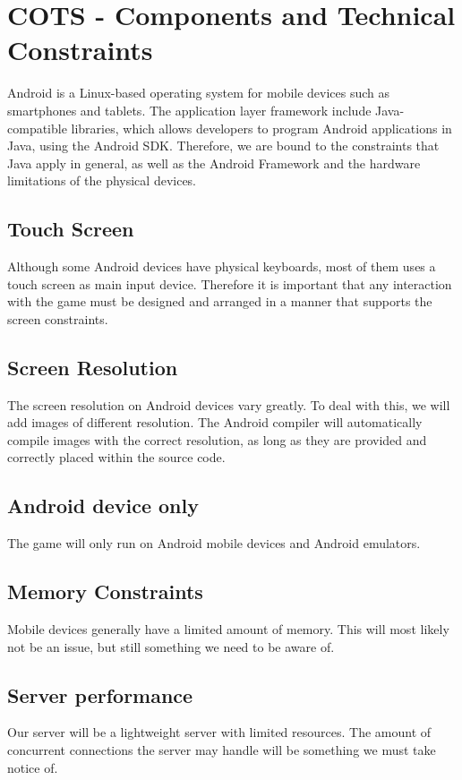 \section{COTS - Components and Technical Constraints}
Android is a Linux-based operating system for mobile devices such as smartphones and tablets. The application layer framework include Java-compatible libraries, which allows developers to program Android applications in Java, using the Android SDK. Therefore, we are bound to the constraints that Java apply in general, as well as the Android Framework and the hardware limitations of the physical devices.

\subsection{Touch Screen}
Although some Android devices have physical keyboards, most of them uses a touch screen as main input device. Therefore it is important that any interaction with the game must be designed and arranged in a manner that supports the screen constraints. 

\subsection{Screen Resolution}
The screen resolution on Android devices vary greatly. To deal with this, we will add images of different resolution. The Android compiler will automatically compile images with the correct resolution, as long as they are provided and correctly placed within the source code.

\subsection{Android device only}
The game will only run on Android mobile devices and Android emulators.

\subsection{Memory Constraints}
Mobile devices generally have a limited amount of memory. This will most likely not be an issue, but still something we need to be aware of.

\subsection{Server performance}
Our server will be a lightweight server with limited resources. The amount of concurrent connections the server may handle will be something we must take notice of.

